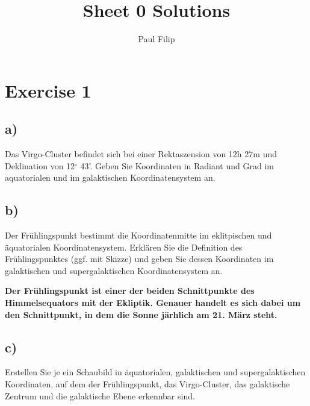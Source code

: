 \documentclass{scrartcl}
\title{Sheet 0 Solutions}
\author{Paul Filip}
\begin{document}
\maketitle

\section*{Exercise 1}

\subsection*{a)}
Das Virgo-Cluster befindet sich bei einer Rektaszension von 12h 27m und Deklination von 12$^\circ$ 43'.
Geben Sie Koordinaten in Radiant und Grad im aquatorialen und im galaktischen Koordinatensystem an.

\vspace{0.5cm}


\subsection*{b)}
Der Frühlingspunkt bestimmt die Koordinatenmitte im eklitpischen und äquatorialen Koordinatensystem.
Erklären Sie die Definition des Frühlingspunktes (ggf. mit Skizze) und geben Sie dessen Koordinaten
im galaktischen und supergalaktischen Koordinatensystem an.

\vspace{0.5cm}
\textbf{Der Frühlingspunkt ist einer der beiden Schnittpunkte des Himmelsequators mit der Ekliptik.
Genauer handelt es sich dabei um den Schnittpunkt, in dem die Sonne järhlich am 21. März steht.}

\vspace{0.5cm}


\subsection*{c)}
Erstellen Sie je ein Schaubild in äquatorialen, galaktischen und supergalaktischen Koordinaten, auf dem
der Frühlingspunkt, das Virgo-Cluster, das galaktische Zentrum und die galaktische Ebene erkennbar sind.
\end{document}
